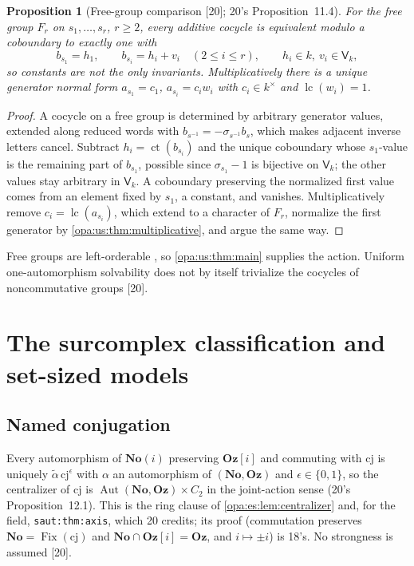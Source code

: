 \documentclass[11pt,oneside]{article}
\numberwithin{equation}{section}
\newtheorem{proposition}[proposition]{Proposition}
\theoremstyle{definition}
\theoremstyle{remark}
\newcommand{\No}{\mathbf{No}}
\newcommand{\Oz}{\mathbf{Oz}}
\newcommand{\Og}{\mathbf{Oz}[i]}
\newcommand{\SC}{\mathbf{No}(i)}
\newcommand{\Aut}{\operatorname{Aut}}
\newcommand{\lc}{\operatorname{lc}}
\newcommand{\ct}{\operatorname{ct}}
\newcommand{\Fix}{\operatorname{Fix}}
\newcommand{\src}[1]{\textup{\textsf{\small[#1]}}}
\newcommand{\lbl}[1]{\nolinkurl{#1}}
\begin{document}
\begin{proposition}[Free-group comparison \src{20}; 20's Proposition~11.4]\label{opa:us:prop:free}
For the free group $F_r$ on $s_1,\dots,s_r$, $r\ge2$, every additive cocycle is equivalent modulo a coboundary to exactly one with
\begin{equation}\label{opa:us:eq:freenormal}
 b_{s_1}=h_1,\qquad b_{s_i}=h_i+v_i\quad(2\le i\le r),\qquad h_i\in k,\ v_i\in\mathsf V_k ,
\end{equation}
so constants are not the only invariants. Multiplicatively there is a unique generator normal form $a_{s_1}=c_1$, $a_{s_i}=c_iw_i$ with
$c_i\in k^\times$ and $\lc(w_i)=1$.
\end{proposition}
\begin{proof}
A cocycle on a free group is determined by arbitrary generator values, extended along reduced words with $b_{s^{-1}}=-\sigma_{s^{-1}}b_s$, which makes
adjacent inverse letters cancel. Subtract $h_i=\ct(b_{s_i})$ and the unique coboundary whose $s_1$-value is the remaining part of $b_{s_1}$, possible
since $\sigma_{s_1}-1$ is bijective on $\mathsf V_k$; the other values stay arbitrary in $\mathsf V_k$. A coboundary preserving the normalized first value
comes from an element fixed by $s_1$, a constant, and vanishes. Multiplicatively remove $c_i=\lc(a_{s_i})$, which extend to a character of $F_r$,
normalize the first generator by \cref{opa:us:thm:multiplicative}, and argue the same way.
\end{proof}

Free groups are left-orderable \cite{Navas}, so \cref{opa:us:thm:main} supplies the action. Uniform one-automorphism solvability does not by
itself trivialize the cocycles of noncommutative groups \src{20}.

\section{The surcomplex classification and set-sized models}\label{opa:us:sec:complex}

\subsection{Named conjugation}

Every automorphism of $\SC$ preserving $\Og$ and commuting with $\mathrm{cj}$ is uniquely $\widetilde\alpha\,\mathrm{cj}^\epsilon$ with $\alpha$ an automorphism of
$(\No,\Oz)$ and $\epsilon\in\{0,1\}$, so the centralizer of $\mathrm{cj}$ is $\Aut(\No,\Oz)\times C_2$ in the joint-action sense (20's Proposition~12.1). This
is the ring clause of \cref{opa:es:lem:centralizer} and, for the field, \lbl{saut:thm:axis}, which 20 credits; its proof (commutation preserves
$\No=\Fix(\mathrm{cj})$ and $\No\cap\Og=\Oz$, and $i\mapsto\pm i$) is 18's. No strongness is assumed \src{20}.
\end{document}
